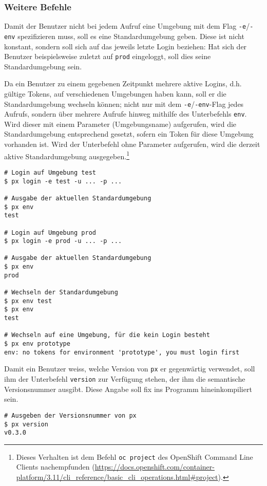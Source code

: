 \subsubsection{Weitere Befehle}

Damit der Benutzer nicht bei jedem Aufruf eine Umgebung mit dem Flag \texttt{-e}/\texttt{-env} spezifizieren muss, soll es eine Standardumgebung geben. Diese ist nicht konstant, sondern soll sich auf das jeweils letzte Login beziehen: Hat sich der Benutzer beispielsweise zuletzt auf \texttt{prod} eingeloggt, soll dies seine Standardumgebung sein.

Da ein Benutzer zu einem gegebenen Zeitpunkt mehrere aktive Logins, d.h. gültige Tokens, auf verschiedenen Umgebungen haben kann, soll er die Standardumgebung wechseln können; nicht nur mit dem \texttt{-e}/\texttt{-env}-Flag jedes Aufrufs, sondern über mehrere Aufrufe hinweg mithilfe des Unterbefehls \texttt{env}. Wird dieser mit einem Parameter (Umgebungsname) aufgerufen, wird die Standardumgebung entsprechend gesetzt, sofern ein Token für diese Umgebung vorhanden ist. Wird der Unterbefehl ohne Parameter aufgerufen, wird die derzeit aktive Standardumgebung ausgegeben.\footnote{Dieses Verhalten ist dem Befehl \texttt{oc project} des OpenShift Command Line Clients nachempfunden (\url{https://docs.openshift.com/container-platform/3.11/cli_reference/basic_cli_operations.html\#project}).}

\begin{lstlisting}[caption={Ausgeben und Wechseln der Standardumgebung}]
# Login auf Umgebung test
$ px login -e test -u ... -p ...

# Ausgabe der aktuellen Standardumgebung
$ px env
test

# Login auf Umgebung prod
$ px login -e prod -u ... -p ...

# Ausgabe der aktuellen Standardumgebung
$ px env
prod

# Wechseln der Standardumgebung
$ px env test
$ px env
test

# Wechseln auf eine Umgebung, für die kein Login besteht
$ px env prototype
env: no tokens for environment 'prototype', you must login first
\end{lstlisting}

Damit ein Benutzer weiss, welche Version von \texttt{px} er gegenwärtig verwendet, soll ihm der Unterbefehl \texttt{version} zur Verfügung stehen, der ihm die semantische Versionsnummer ausgibt. Diese Angabe soll fix ins Programm hineinkompiliert sein.

\begin{lstlisting}[caption={Ausgeben der Versionsnummer}]
# Ausgeben der Versionsnummer von px
$ px version
v0.3.0
\end{lstlisting}

